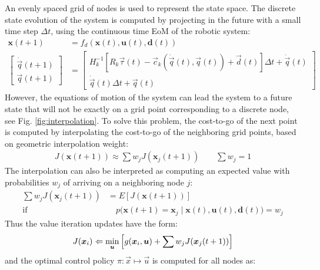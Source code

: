 An evenly spaced grid of nodes is used to represent the state space. The discrete state evolution of the system is computed by projecting in the future with a small time step $\Delta t$, using the continuous time EoM of the robotic system:
%
\begin{align}
\boldsymbol{x}(t+1) &= f_d( \boldsymbol{x}(t) , \boldsymbol{u}(t) , \boldsymbol{d}(t) ) \\
\left[ \begin{array}{c} 
	\dot{\vec{q}}(t+1) \\ \vec{q}(t+1)
\end{array} \right] &= 
\left[ \begin{array}{c} 
	H_k^{-1} \left[ R_k \vec{\tau}(t) - \vec{c}_k( \dot{\vec{q}}(t) , \vec{q}(t))  + \vec{d}(t)  \right] \Delta t + \dot{\vec{q}}(t)  \\ \dot{\vec{q}}(t)  \Delta t + \vec{q}(t) 
\end{array} \right]
\end{align}
%
However, the equations of motion of the system can lead the system to a future state that will not be exactly on a grid point corresponding to a discrete node, see Fig. \ref{fig:interpolation}. To solve this problem, the cost-to-go of the next point is computed by interpolating the cost-to-go of the neighboring grid points, based on geometric interpolation weight:
%
\begin{align}
	J(\boldsymbol{x}(t+1)) \approx \sum{ w_j J(\boldsymbol{x}_j(t+1)) }  \quad \quad \sum{ w_j  } = 1
	\label{eq:interpol}
\end{align}
%
The interpolation can also be interpreted as computing an expected value with probabilities $w_j$ of arriving on a neighboring node $j$:
%
\begin{align}
	\sum{ w_j J(\boldsymbol{x}_j(t+1)) }   &= E \left[ J(\boldsymbol{x}(t+1)) \right] \\ 
	\text{if} & \quad
	p \Big(
	\boldsymbol{x}(t+1) = \boldsymbol{x}_j 
	\; \Big| \; 
	\boldsymbol{x}(t) , \boldsymbol{u}(t) , \boldsymbol{d}(t) 
	\Big)  = w_j
	\label{eq:expectation}
\end{align}
%
Thus the value iteration updates have the form:
%
\begin{align}
	J(\boldsymbol{x}_i) \Leftarrow \operatornamewithlimits{min}\limits_{\boldsymbol{u}} 
	\left[ g(\boldsymbol{x}_i,\boldsymbol{u}) + \sum{ w_j J(\boldsymbol{x}_j(t+1))}  \right]
\end{align}
%
and the optimal control policy $\pi:\vec{x}\mapsto\vec{u}$ is computed for all nodes as:
